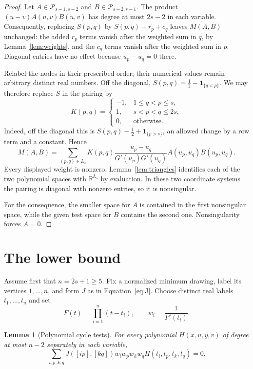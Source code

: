 \documentclass[11pt,a4paper]{article}
\newtheorem{lemma}[theorem]{Lemma}
\theoremstyle{remark}
\numberwithin{equation}{section}
\newcommand{\R}{\mathbb R}
\newcommand{\PP}{\mathcal P}
\begin{document}
\begin{proof}
Let \(A\in\PP_{s-1,s-2}\) and \(B\in\PP_{s-2,s-1}\).
The product \((u-v)A(u,v)B(u,v)\) has degree at most \(2s-2\)
in each variable. Consequently, replacing \(S(p,q)\) by
\(S(p,q)+r_p+c_q\) leaves \(M(A,B)\) unchanged: the added
\(r_p\) terms vanish after the weighted sum in \(q\), by
Lemma~\ref{lem:weights}, and the \(c_q\) terms vanish after
the weighted sum in \(p\). Diagonal entries have no effect
because \(u_p-u_q=0\) there.

Relabel the nodes in their prescribed order; their numerical values
remain arbitrary distinct real numbers. Off the diagonal,
\(S(p,q)=\tfrac12-\mathbf1_{\{q<p\}}\). We may therefore replace
\(S\) in the pairing by
\[
K(p,q)=
\begin{cases}
-1,&1\le q<p\le s,\\
 1,&s<p<q\le2s,\\
 0,&\text{otherwise}.
\end{cases}
\]
Indeed, off the diagonal this is
\(S(p,q)-\tfrac12+\mathbf1_{\{p>s\}}\), an allowed change by
a row term and a constant. Hence
\[
M(A,B)=\sum_{(p,q)\in L_s}
K(p,q)\frac{u_p-u_q}{G'(u_p)G'(u_q)}
A(u_p,u_q)B(u_p,u_q).
\]
Every displayed weight is nonzero. Lemma~\ref{lem:triangles}
identifies each of the two polynomial spaces with \(\R^{L_s}\)
by evaluation. In these two coordinate systems the pairing is
diagonal with nonzero entries, so it is nonsingular.

For the consequence, the smaller space for \(A\) is contained
in the first nonsingular space, while the given test space for
\(B\) contains the second one. Nonsingularity forces \(A=0\).
\end{proof}

\section{The lower bound}\label{sec:lower}

Assume first that \(n=2s+1\ge5\). Fix a normalized minimum drawing,
label its vertices \(1,\ldots,n\), and form \(J\) as in
Equation~\eqref{eq:J}. Choose distinct real labels \(t_1,\ldots,t_n\)
and set
\[
F(t)=\prod_{i=1}^{n}(t-t_i),\qquad w_i=\frac1{F'(t_i)}.
\]

\begin{lemma}[Polynomial cycle tests]\label{lem:tests}
For every polynomial \(H(x,u,y,v)\) of degree at most \(n-2\)
separately in each variable,
\begin{equation}\label{eq:test}
\sum_{i,p,k,q}
J([ip],[kq])w_iw_pw_kw_q H(t_i,t_p,t_k,t_q)=0.
\end{equation}
\end{lemma}
\end{document}
